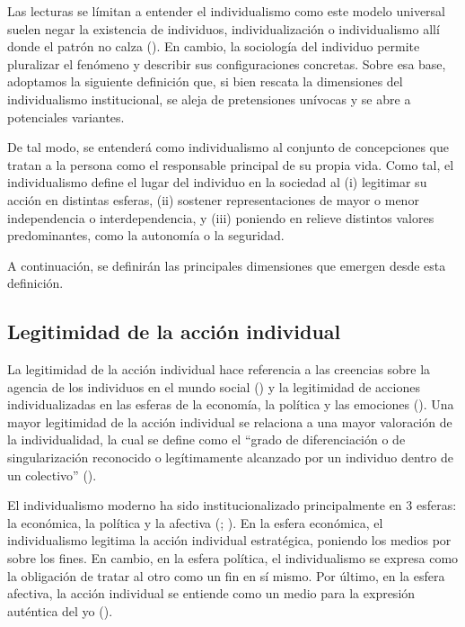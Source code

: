 \documentclass[
  12pt,
  letterpaper,
  DIV=11,
  numbers=noendperiod]{scrartcl}
\begin{document}
Las lecturas se límitan a entender el individualismo como este modelo
universal suelen negar la existencia de individuos, individualización o
individualismo allí donde el patrón no calza
(). En cambio, la
sociología del individuo permite pluralizar el fenómeno y describir sus
configuraciones concretas. Sobre esa base, adoptamos la siguiente
definición que, si bien rescata la dimensiones del individualismo
institucional, se aleja de pretensiones unívocas y se abre a potenciales
variantes.

De tal modo, se entenderá como individualismo al conjunto de
concepciones que tratan a la persona como el responsable principal de su
propia vida. Como tal, el individualismo define el lugar del individuo
en la sociedad al (i) legitimar su acción en distintas esferas, (ii)
sostener representaciones de mayor o menor independencia o
interdependencia, y (iii) poniendo en relieve distintos valores
predominantes, como la autonomía o la seguridad.

A continuación, se definirán las principales dimensiones que emergen
desde esta definición.

\subsection{Legitimidad de la acción
individual}\label{legitimidad-de-la-acciuxf3n-individual}

La legitimidad de la acción individual hace referencia a las creencias
sobre la agencia de los individuos en el mundo social
() y la legitimidad de
acciones individualizadas en las esferas de la economía, la política y
las emociones ().
Una mayor legitimidad de la acción individual se relaciona a una mayor
valoración de la individualidad, la cual se define como el ``grado de
diferenciación o de singularización reconocido o legítimamente alcanzado
por un individuo dentro de un colectivo''
().

El individualismo moderno ha sido institucionalizado principalmente en 3
esferas: la económica, la política y la afectiva
(;
). En la esfera
económica, el individualismo legitima la acción individual estratégica,
poniendo los medios por sobre los fines. En cambio, en la esfera
política, el individualismo se expresa como la obligación de tratar al
otro como un fin en sí mismo. Por último, en la esfera afectiva, la
acción individual se entiende como un medio para la expresión auténtica
del yo ().
\end{document}
